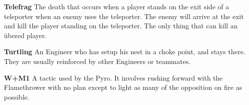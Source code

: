 {\bf Telefrag} The death that occurs when a player stands on the exit side of a teleporter when an enemy uses the teleporter. The enemy will arrive at the exit and kill the player standing on the teleporter. The only thing that can kill an übered player.

{\bf Turtling} An Engineer who has setup his nest in a choke point, and stays there. They are usually reinforced by other Engineers or teammates.

{\bf W+M1} A tactic used by the Pyro. It involves rushing forward with the Flamethrower with no plan except to light as many of the opposition on fire as possible.